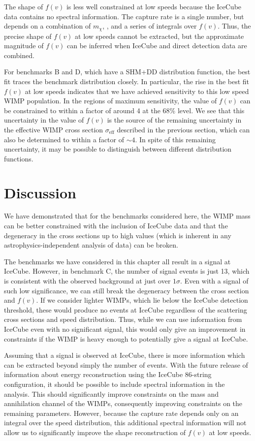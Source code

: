 The shape of $f(v)$ is less well constrained at low speeds because the IceCube data contains no spectral information. The capture rate is a single number, but depends on a combination of $m_\chi$, \sigmapsi, \sigmapsd and a series of integrals over $f(v)$. Thus, the precise shape of $f(v)$ at low speeds cannot be extracted, but the approximate magnitude of $f(v)$ can be inferred when IceCube and direct detection data are combined.

For benchmarks B and D, which have a SHM+DD distribution function, the best fit traces the benchmark distribution closely. In particular, the rise in the best fit $f(v)$ at low speeds indicates that we have achieved sensitivity to this low speed WIMP population. In the regions of maximum sensitivity, the value of $f(v)$ can be constrained to within a factor of around 4 at the 68\% level. We see that this uncertainty in the value of $f(v)$ is the source of the remaining uncertainty in the effective WIMP cross section $\sigma_\textrm{eff}$ described in the previous section, which can also be determined to within a factor of $\sim 4$. In spite of this remaining uncertainty, it may be possible to distinguish between different distribution functions.

\section{Discussion}

We have demonstrated that for the benchmarks considered here, the WIMP mass can be better constrained with the inclusion of IceCube data and that the degeneracy in the cross sections up to high values (which is inherent in any astrophysics-independent analysis of data) can be broken.

The benchmarks we have considered in this chapter all result in a signal at IceCube. However, in benchmark C, the number of signal events is just 13, which is consistent with the observed background at just over $1\sigma$. Even with a signal of such low significance, we can still break the degeneracy between the cross section and $f(v)$. If we consider lighter WIMPs, which lie below the IceCube detection threshold, these would produce no events at IceCube regardless of the scattering cross sections and speed distribution. Thus, while we can use information from IceCube even with no significant signal, this would only give an improvement in constraints if the WIMP is heavy enough to potentially give a signal at IceCube.

Assuming that a signal is observed at IceCube, there is more information which can be extracted beyond simply the number of events. With the future release of information about energy reconstruction using the IceCube 86-string configuration, it should be possible to include spectral information in the analysis. This should significantly improve constraints on the mass and annihilation channel of the WIMPs, consequently improving constraints on the remaining parameters. However, because the capture rate depends only on an integral over the speed distribution, this additional spectral information will not allow us to significantly improve the shape reconstruction of $f(v)$ at low speeds.

